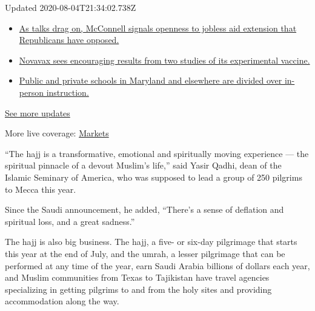Updated 2020-08-04T21:34:02.738Z

\begin{itemize}
\tightlist
\item
  \href{https://www.nytimes3xbfgragh.onion/2020/08/04/world/coronavirus-cases.html?action=click\&pgtype=Article\&state=default\&region=MAIN_CONTENT_1\&context=storylines_live_updates\#link-2daa96b5}{As
  talks drag on, McConnell signals openness to jobless aid extension
  that Republicans have opposed.}
\item
  \href{https://www.nytimes3xbfgragh.onion/2020/08/04/world/coronavirus-cases.html?action=click\&pgtype=Article\&state=default\&region=MAIN_CONTENT_1\&context=storylines_live_updates\#link-1228a480}{Novavax
  sees encouraging results from two studies of its experimental
  vaccine.}
\item
  \href{https://www.nytimes3xbfgragh.onion/2020/08/04/world/coronavirus-cases.html?action=click\&pgtype=Article\&state=default\&region=MAIN_CONTENT_1\&context=storylines_live_updates\#link-4825b93}{Public
  and private schools in Maryland and elsewhere are divided over
  in-person instruction.}
\end{itemize}

\href{https://www.nytimes3xbfgragh.onion/2020/08/04/world/coronavirus-cases.html?action=click\&pgtype=Article\&state=default\&region=MAIN_CONTENT_1\&context=storylines_live_updates}{See
more updates}

More live coverage:
\href{https://www.nytimes3xbfgragh.onion/live/2020/08/04/business/stock-market-today-coronavirus?action=click\&pgtype=Article\&state=default\&region=MAIN_CONTENT_1\&context=storylines_live_updates}{Markets}

``The hajj is a transformative, emotional and spiritually moving
experience --- the spiritual pinnacle of a devout Muslim's life,'' said
Yasir Qadhi, dean of the Islamic Seminary of America, who was supposed
to lead a group of 250 pilgrims to Mecca this year.

Since the Saudi announcement, he added, ``There's a sense of deflation
and spiritual loss, and a great sadness.''

The hajj is also big business. The hajj, a five- or six-day pilgrimage
that starts this year at the end of July, and the umrah, a lesser
pilgrimage that can be performed at any time of the year, earn Saudi
Arabia billions of dollars each year, and Muslim communities from Texas
to Tajikistan have travel agencies specializing in getting pilgrims to
and from the holy sites and providing accommodation along the way.

